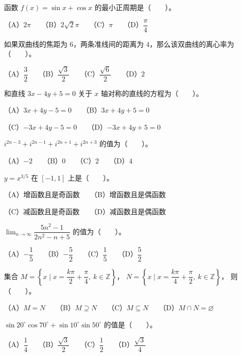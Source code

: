 \begin{question}
函数 $f(x)=\sin x+\cos x$ 的最小正周期是\mbox{（　　）}。

（A）$2\pi$　　（B）$2\sqrt2\pi$　　（C）$\pi$　　（D）$\dfrac\pi4$

\end{question}
\begin{question}
如果双曲线的焦距为 $6$，两条准线间的距离为 $4$，那么该双曲线的离心率为\mbox{（　　）}。

（A）$\dfrac32$　　（B）$\dfrac{\sqrt3}{2}$　　（C）$\dfrac{\sqrt6}{2}$　　（D）$2$

\end{question}
\begin{question}
和直线 $3x-4y+5=0$ 关于 $x$ 轴对称的直线的方程为\mbox{（　　）}。

（A）$3x+4y-5=0$　　（B）$3x+4y+5=0$

（C）$-3x+4y-5=0$　　（D）$-3x+4y+5=0$

\end{question}
\begin{question}
$i^{2n-3}+i^{2n-1}+i^{2n+1}+i^{2n+3}$ 的值为\mbox{（　　）}。

（A）$-2$　　（B）$0$　　（C）$2$　　（D）$4$

\end{question}
\begin{question}
$y=x^{3/5}$ 在 $[-1,1]$ 上是\mbox{（　　）}。

（A）增函数且是奇函数　　（B）增函数且是偶函数

（C）减函数且是奇函数　　（D）减函数且是偶函数

\end{question}
\begin{question}
$\displaystyle\lim_{n\to\infty}\dfrac{5n^2-1}{2n^2-n+5}$ 的值为\mbox{（　　）}。

（A）$-\dfrac15$　　（B）$-\dfrac52$　　（C）$\dfrac15$　　（D）$\dfrac52$

\end{question}
\begin{question}
集合
$M=\left\{x\mid x=\dfrac{k\pi}{2}+\dfrac\pi4,\ k\in\mathbb Z\right\}$，
$N=\left\{x\mid x=\dfrac{k\pi}{4}+\dfrac\pi2,\ k\in\mathbb Z\right\}$，
则\mbox{（　　）}。

（A）$M=N$　　（B）$M\supseteq N$　　（C）$M\subseteq N$　　（D）$M\cap N=\varnothing$

\end{question}
\begin{question}
$\sin20^\circ\cos70^\circ+\sin10^\circ\sin50^\circ$ 的值是\mbox{（　　）}。

（A）$\dfrac14$　　（B）$\dfrac{\sqrt3}{2}$　　（C）$\dfrac12$　　（D）$\dfrac{\sqrt3}{4}$

\end{question}
